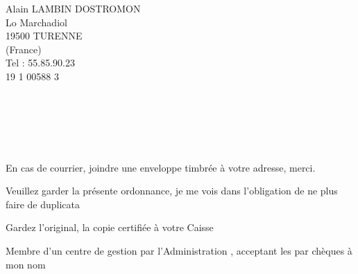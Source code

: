 Alain LAMBIN DOSTROMON\\
Lo Marchadiol\\
19500 TURENNE\\
(France)\\
Tel : 55.85.90.23\\
19 1 00588 3\\

\\


\\
\\
\\

\\

En cas de courrier, joindre une enveloppe timbrée à votre adresse, merci.

Veuillez garder la présente ordonnance, je me vois dans l'obligation de ne plus faire de duplicata

Gardez l'original,  la copie certifiée à votre Caisse

Membre d'un centre de gestion  par l'Administration , acceptant les  par chèques  à mon nom
